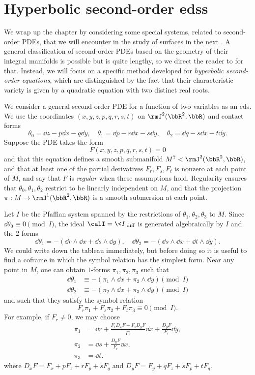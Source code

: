 \section{Hyperbolic second-order \texorpdfstring{\glspl{eds}}{EDSs}}\label{sec: hyperbolic EDS}

We wrap up the chapter by considering some special systems, related to second-order PDEs, that we will encounter in the study of surfaces in the next \chap. A general classification of second-order PDEs based on the geometry of their integral manifolds is possible but is quite lengthy, so we direct the reader to \cite[\S VII.1]{Bryant} for that. Instead, we will focus on a specific method developed for \emph{hyperbolic second-order equations}, which are distinguished by the fact that their characteristic variety is given by a quadratic equation with two distinct real roots.

We consider a general second-order PDE for a function of two variables as an \gls{eds}. We use the coordinates $(x,y,z,p,q,r,s,t)$ on $\rmJ^2(\bbR^2,\bbR)$ and contact forms 
\[\theta_0=\dd z-p \dd x-q\dd y,\quad \theta_1=\dd p-r\dd x-s\dd y,\quad \theta_2=\dd q-s\dd x-t\dd y.\]
Suppose the PDE takes the form 
\[F(x,y,z,p,q,r,s,t)=0\label{eq 7.10 Ivey}\]
and that this equation defines a smooth submanifold $M^7<\rmJ^2(\bbR^2,\bbR)$, and that at least one of the partial derivatives $F_r,F_s,F_t$ is nonzero at each point of $M$, and say that $F$ is \emph{regular} when these assumptions hold. Regularity ensures that $\theta_0,\theta_1,\theta_2$ restrict to be linearly independent on $M$, and that the projection $\pi:M\to \rmJ^1(\bbR^2,\bbR)$ is a smooth submersion at each point. 

Let $I$ be the Pfaffian system spanned by the restrictions of $\theta_1,\theta_2,\theta_3$ to $M$. Since $\dd\theta_0\equiv 0\pmod{I}$, the ideal $\calI=\<I\>_{\mathrm{diff}}$ is generated algebraically by $I$ and the $2$-forms 
\[\dd\theta_1=-(\dd r\wedge \dd x+\dd s\wedge \dd y),\quad \dd\theta_2=-(\dd s\wedge\dd x+\dd t\wedge\dd y).\]
We could write down the tableau immediately, but before doing so it is useful to find a coframe in which the symbol relation has the simplest form. Near any point in $M$, one can obtain $1$-forms $\pi_1,\pi_2,\pi_3$ such that 
\begin{align}
    \dd\theta_1& \equiv -(\pi_1\wedge \dd x+\pi_2\wedge\dd y )\pmod{I} \\
    \dd\theta_2& \equiv -(\pi_2\wedge\dd x+\pi_3\wedge\dd y) \pmod{I}
\end{align}
and such that they satisfy the symbol relation 
\[F_r\pi_1+F_s\pi_2+F_t\pi_3\equiv 0\pmod{I}.\label{eq 6.15 Ivey}\]
For example, if $F_r\neq 0$, we may choose 
\begin{align}
    \pi_1&= \dd r+\frac{F_rD_xF-F_sD_yF}{F_r^2}\dd x+\frac{D_y F}{F_r}\dd y,\\
    \pi_2&=\dd s+\frac{D_y F}{F_r}\dd x,\\
    \pi_3&=\dd t.
\end{align}
where $D_xF=F_x+pF_z+rF_p+sF_q$ and $D_yF=F_y+qF_z+sF_p+tF_q$.

